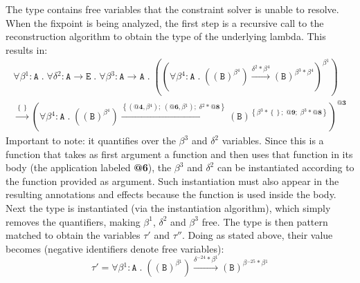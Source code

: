 \documentclass[8pt]{extarticle}
\begin{document}
The type contains free variables that the constraint solver is unable to resolve. When the fixpoint is being analyzed, the first step is a recursive call to the reconstruction algorithm to obtain the type of the underlying lambda. This results in:
\[
\begin{array}{c}
\forall{}\beta{}^{1}:\mathtt{A}\;{}.\;{}\forall{}\delta{}^{2}:\mathtt{A}\to{}\mathtt{E}\;{}.\;{}\forall{}\beta{}^{3}:\mathtt{A}\to{}\mathtt{A}\;{}.\;{}\left(\left(\forall{}\beta{}^{4}:\mathtt{A}\;{}.\;{}\left(\left(\mathtt{B}\right)^{\beta{}^{4}}\right)\xrightarrow{\delta{}^{2}*\beta{}^{4}}\left(\mathtt{B}\right)^{\beta{}^{3}*\beta{}^{4}}\right)^{\beta{}^{1}}\right)\\
\xrightarrow{\left\{\right\}}\left(\forall{}\beta{}^{4}:\mathtt{A}\;{}.\;{}\left(\left(\mathtt{B}\right)^{\beta{}^{4}}\right)\xrightarrow{\left\{\left(\textbf{@4},\beta{}^{4}\right);\;{}\left(\textbf{@6},\beta{}^{1}\right);\;{}\delta{}^{2}*\textbf{@8}\right\}}\left(\mathtt{B}\right)^{\left\{\beta{}^{3}*\left\{\right\};\;{}\textbf{@9};\;{}\beta{}^{3}*\textbf{@8}\right\}}\right)^{\textbf{@3}}
\end{array}
\]
Important to note: it quantifies over the $\beta^3$ and $\delta^2$ variables. Since this is a function that takes as first argument a function and then uses that function in its body (the application labeled {\bf @6}), the $\beta^3$ and $\delta^2$ can be instantiated according to the function provided as argument. Such instantiation must also appear in the resulting annotations and effects because the function is used inside the body. Next the type is instantiated (via the instantiation algorithm), which simply removes the quantifiers, making $\beta^1$, $\delta^2$ and $\beta^3$ free. The type is then pattern matched to obtain the variables $\tau'$ and $\tau''$. Doing as stated above, their value becomes (negative identifiers denote free variables):
\[
\tau' = \forall{}\beta{}^{1}:\mathtt{A}\;{}.\;{}\left(\left(\mathtt{B}\right)^{\beta{}^{1}}\right)\xrightarrow{\delta{}^{-24}*\beta{}^{1}}\left(\mathtt{B}\right)^{\beta{}^{-25}*\beta{}^{1}}
\]
\end{document}
